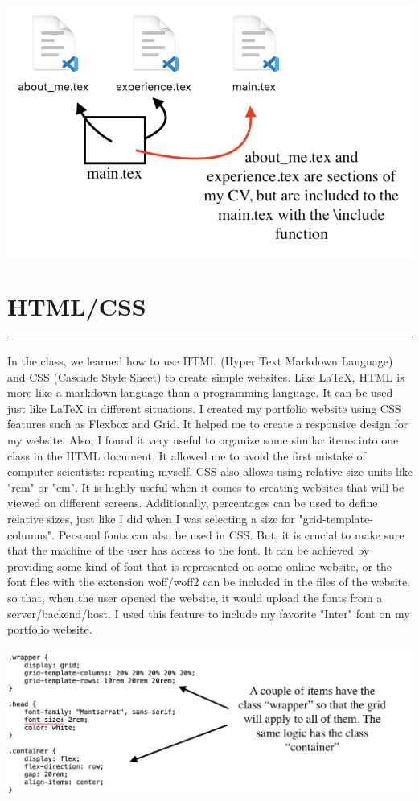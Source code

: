 \documentclass[a4paper,11pt]{article}
\newcommand{\sectitle}[1]{
    \vspace{1.5ex}
    \section{#1}
    \vspace{-3ex}
    \noindent\rule{\textwidth}{0.7pt}
    \vspace{-4ex}
}
\begin{document}
\begin{center}
\includegraphics[scale=0.65]{latex.png}
\end{center}

\sectitle{HTML/CSS}

\paragraph{}
In the class, we learned how to use HTML (Hyper Text Markdown Language) and CSS (Cascade Style Sheet) to create simple websites. Like LaTeX, HTML is more like a markdown language than a programming language. It can be used just like LaTeX in different situations. I created my portfolio website using CSS features such as Flexbox and Grid. It helped me to create a responsive design for my website. Also, I found it very useful to organize some similar items into one class in the HTML document. It allowed me to avoid the first mistake of computer scientists: repeating myself. CSS also allows using relative size units like "rem" or "em". It is highly useful when it comes to creating websites that will be viewed on different screens. Additionally, percentages can be used to define relative sizes, just like I did when I was selecting a size for "grid-template-columns". Personal fonts can also be used in CSS. But, it is crucial to make sure that the machine of the user has access to the font. It can be achieved by providing some kind of font that is represented on some online website, or the font files with the extension woff/woff2 can be included in the files of the website, so that, when the user opened the website, it would upload the fonts from a server/backend/host. I used this feature to include my favorite "Inter" font on my portfolio website.
\begin{center}
\includegraphics[scale=0.7]{web.png}
\end{center}
\end{document}
